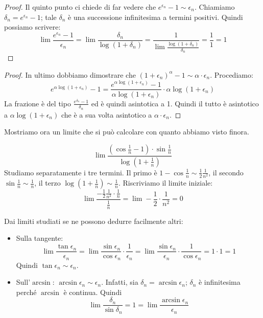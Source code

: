 \begin{proof}
Il quinto punto ci chiede di far vedere che $e^{\epsilon_n}-1 \sim \epsilon_n$. Chiamiamo $\delta_n = e^{\epsilon_n}-1$; tale $\delta_n$ è una successione infinitesima a termini positivi. Quindi possiamo scrivere:
\begin{equation*}
\lim \frac{e^{\epsilon_n}-1}{\epsilon_n} = \lim \frac{\delta_n}{\log(1+\delta_n)} = \frac{1}{\lim \frac{\log(1+\delta_n)}{\delta_n}} = \frac{1}{1} = 1
\end{equation*}
\end{proof}

\begin{proof}
In ultimo dobbiamo dimostrare che $(1+\epsilon_n)^\alpha - 1 \sim \alpha \cdot \epsilon_n$. Procediamo:
\begin{equation*}
e^{\alpha \log(1+\epsilon_n)} - 1 = \frac{e^{\alpha \log(1+\epsilon_n)} - 1}{\alpha \log(1+\epsilon_n)} \cdot \alpha \log(1+\epsilon_n)
\end{equation*}
La frazione è del tipo $\frac{e^{\delta_n}-1}{\delta_n}$ ed è quindi asintotica a 1. Quindi il tutto è asintotico a $\alpha \log(1+\epsilon_n)$ che è a sua volta asintotico a $\alpha \cdot \epsilon_n$.
\end{proof}

Mostriamo ora un limite che si può calcolare con quanto abbiamo visto finora.
\begin{example}
\begin{equation*}
\lim \frac{\left(\cos \frac{1}{n} - 1\right) \cdot \sin \frac{1}{n}}{\log \left(1+\frac{1}{n}\right)}
\end{equation*}
Studiamo separatamente i tre termini. Il primo è $1-\cos \frac{1}{n} \sim \frac{1}{2} \frac{1}{n^2}$, il secondo $\sin \frac{1}{n} \sim \frac{1}{n}$, il terzo $\log(1+\frac{1}{n}) \sim \frac{1}{n}$. Riscriviamo il limite iniziale:
\begin{equation*}
\lim \frac{-\frac{1}{2} \frac{1}{n^2} \cdot \frac{1}{n}}{\frac{1}{n}} = \lim -\frac{1}{2} \cdot \frac{1}{n^2} = 0
\end{equation*}
\end{example}

Dai limiti studiati se ne possono dedurre facilmente altri:
\begin{itemize}
\item Sulla tangente:
\begin{equation*} 
\lim \frac{\tan \epsilon_n}{\epsilon_n} = \lim \frac{\sin \epsilon_n}{\cos \epsilon_n} \cdot \frac{1}{\epsilon_n} = \lim \frac{\sin \epsilon_n}{\epsilon_n} \cdot \frac{1}{\cos \epsilon_n} = 1 \cdot 1 = 1
\end{equation*}
Quindi $\tan \epsilon_n \sim \epsilon_n$.
\item Sull'$\arcsin$: $\arcsin \epsilon_n \sim \epsilon_n$. Infatti, sia $\delta_n = \arcsin \epsilon_n$; $\delta_n$ è infinitesima perché $\arcsin$ è continua. Quindi
\begin{equation*}
\lim \frac{\delta_n}{\sin \delta_n} = 1 = \lim \frac{\arcsin \epsilon_n}{\epsilon_n}
\end{equation*}
\end{itemize}

